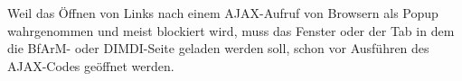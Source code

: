 Weil das Öffnen von Links nach einem AJAX-Aufruf von Browsern als Popup wahrgenommen und meist blockiert wird, muss das Fenster oder der Tab in dem die BfArM- oder DIMDI-Seite geladen werden soll, schon vor Ausführen des AJAX-Codes geöffnet werden. 

